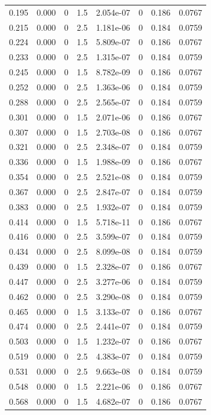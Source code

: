 \documentclass[preview]{standalone}
\begin{document}
{{\begin{tabular}{L{1.2cm}C{1.2cm} C{0.3cm}C{0.5cm} C{1.4cm}C{1.4cm} C{1.4cm}C{1.4cm}}
  0.195  &  0.000  & 0     & 1.5 &  2.054e-07  & 0  & 0.186 &  0.0767   \\ 
  0.215  &  0.000  & 0     & 2.5 &  1.181e-06  & 0  & 0.184 &  0.0759   \\ 
  0.224  &  0.000  & 0     & 1.5 &  5.809e-07  & 0  & 0.186 &  0.0767   \\ 
  0.233  &  0.000  & 0     & 2.5 &  1.315e-07  & 0  & 0.184 &  0.0759   \\ 
  0.245  &  0.000  & 0     & 1.5 &  8.782e-09  & 0  & 0.186 &  0.0767   \\ 
  0.252  &  0.000  & 0     & 2.5 &  1.363e-06  & 0  & 0.184 &  0.0759   \\ 
  0.288  &  0.000  & 0     & 2.5 &  2.565e-07  & 0  & 0.184 &  0.0759   \\ 
  0.301  &  0.000  & 0     & 1.5 &  2.071e-06  & 0  & 0.186 &  0.0767   \\ 
  0.307  &  0.000  & 0     & 1.5 &  2.703e-08  & 0  & 0.186 &  0.0767   \\ 
  0.321  &  0.000  & 0     & 2.5 &  2.348e-07  & 0  & 0.184 &  0.0759   \\ 
  0.336  &  0.000  & 0     & 1.5 &  1.988e-09  & 0  & 0.186 &  0.0767   \\ 
  0.354  &  0.000  & 0     & 2.5 &  2.521e-08  & 0  & 0.184 &  0.0759   \\ 
  0.367  &  0.000  & 0     & 2.5 &  2.847e-07  & 0  & 0.184 &  0.0759   \\ 
  0.383  &  0.000  & 0     & 2.5 &  1.932e-07  & 0  & 0.184 &  0.0759   \\ 
  0.414  &  0.000  & 0     & 1.5 &  5.718e-11  & 0  & 0.186 &  0.0767   \\ 
  0.416  &  0.000  & 0     & 2.5 &  3.599e-07  & 0  & 0.184 &  0.0759   \\ 
  0.434  &  0.000  & 0     & 2.5 &  8.099e-08  & 0  & 0.184 &  0.0759   \\ 
  0.439  &  0.000  & 0     & 1.5 &  2.328e-07  & 0  & 0.186 &  0.0767   \\ 
  0.447  &  0.000  & 0     & 2.5 &  3.277e-06  & 0  & 0.184 &  0.0759   \\ 
  0.462  &  0.000  & 0     & 2.5 &  3.290e-08  & 0  & 0.184 &  0.0759   \\ 
  0.465  &  0.000  & 0     & 1.5 &  3.133e-07  & 0  & 0.186 &  0.0767   \\ 
  0.474  &  0.000  & 0     & 2.5 &  2.441e-07  & 0  & 0.184 &  0.0759   \\ 
  0.503  &  0.000  & 0     & 1.5 &  1.232e-07  & 0  & 0.186 &  0.0767   \\ 
  0.519  &  0.000  & 0     & 2.5 &  4.383e-07  & 0  & 0.184 &  0.0759   \\ 
  0.531  &  0.000  & 0     & 2.5 &  9.663e-08  & 0  & 0.184 &  0.0759   \\ 
  0.548  &  0.000  & 0     & 1.5 &  2.221e-06  & 0  & 0.186 &  0.0767   \\ 
  0.568  &  0.000  & 0     & 1.5 &  4.682e-07  & 0  & 0.186 &  0.0767   \\ 
\hline 
\end{tabular} 

}}
\end{document}
